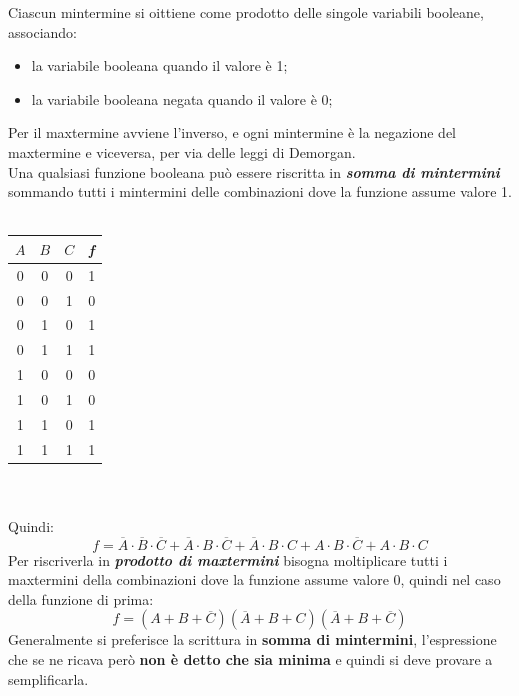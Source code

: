 \documentclass[12pt]{report}
\begin{document}
					Ciascun mintermine si oittiene come prodotto delle singole variabili booleane, associando:
					\begin{itemize}
						\item la variabile booleana quando il valore è 1;
						\item la variabile booleana negata quando il valore è 0;
					\end{itemize}
					Per il maxtermine avviene l'inverso, e ogni mintermine è la negazione del maxtermine e viceversa, per via delle leggi di Demorgan. \\
					Una qualsiasi funzione booleana può essere riscritta in \textbf{\textit{\color{red}somma di mintermini}} sommando tutti i mintermini delle combinazioni dove la funzione assume valore 1.\\ \\
					\begin{tabular}{c|c|c|c}
						$A$ & $B$ & $C$ & \textbf{\textit{f}} \\
						\hline
						0 & 0 & 0 & 1 \\
						0 & 0 & 1 & 0 \\
						0 & 1 & 0 & 1 \\
						0 & 1 & 1 & 1 \\
						1 & 0 & 0 & 0 \\
						1 & 0 & 1 & 0 \\
						1 & 1 & 0 & 1 \\
						1 & 1 & 1 & 1 \\
					\end{tabular} \\ \\
					Quindi:
					\[
					f = \overline{A}\cdot\overline{B}\cdot\overline{C} + \overline{A}\cdot B \cdot\overline{C} + \overline{A}\cdot B \cdot C + A \cdot B \cdot\overline{C} + A \cdot B \cdot C
					\]
				Per riscriverla in \textbf{\textit{\color{red}prodotto di maxtermini}} bisogna moltiplicare tutti i maxtermini della combinazioni dove la funzione assume valore 0, quindi nel caso della funzione di prima:
				\[
				f=(A + B + \overline{C})(\overline{A} + B + C)(\overline{A} + B + \overline{C})
				\]
				Generalmente si preferisce la scrittura in \textbf{somma di mintermini}, l'espressione che se ne ricava però \textbf{non è detto che sia minima} e quindi si deve provare a semplificarla.
\end{document}
